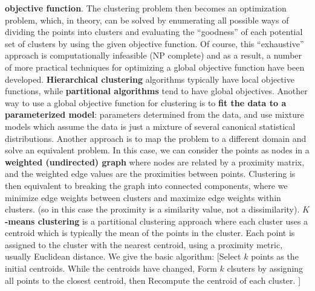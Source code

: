 \documentclass{amsbook}
\makeatletter
\theoremstyle{plain}
\theoremstyle{definition}
\theoremstyle{remark}
\newenvironment{restoretext}%
    {\@parboxrestore%
     \begin{adjustwidth}{}{\leftmargin}%
    }{\end{adjustwidth}
     }
\makeatother
\begin{document}
\textbf{objective  function}.  The  clustering  problem  then  becomes  an  optimization  problem,  
which,  in  theory,  can  be  solved  by  enumerating  all  possible  ways  of  dividing  the  points  
into clusters and evaluating the ``goodness” of each potential set of clusters by using the 
given  objective  function.    Of  course,  this ``exhaustive”  approach  is  computationally  
infeasible  (NP  complete)  and  as  a  result,  a  number  of  more  practical  techniques  for  
optimizing a global objective function have been developed. \textbf{Hierarchical clustering} algorithms typically have local objective functions, while \textbf{partitional algorithms} tend to have global objectives. Another way to use a global objective function for clustering is to \textbf{fit the data to a parameterized model}: parameters determined from the data, and use mixture models which assume the data is just a mixture of several canonical statistical distributions. Another approach is to map the problem to a different domain and solve an equivalent problem. In this case, we can consider the points as nodes in a \textbf{weighted (undirected) graph} where nodes are related by a proximity matrix, and the weighted edge values are the proximities between points. Clustering is then equivalent to breaking the graph into connected components, where we minimize edge weights between clusters and maximize edge weights within clusters. (so in this case the proximity is a similarity value, not a dissimilarity). \textbf{$K$-means clustering} is a partitional clustering approach where each cluster uses a centroid which is typically the mean of the points in the cluster. Each point is assigned to the cluster with the nearest centroid, using a proximity metric, usually Euclidean distance. We give the basic algorithm: [Select $k$ points as the initial centroids. 
While the centroids have changed, Form $k$ clsuters by assigning all points to the closest centroid, then
	Recompute the centroid of each cluster. ]
\begin{comment}
\begin{restoretext}
\begin{algorithm}[H]\label{alg1}
Select $k$ points as the initial centroids. \\
\While{the centroids have changed}{
	Form $k$ clsuters by assigning all points to the closest centroid. \\
	Recompute the centroid of each cluster. 
}
\caption{Cluster$(k)$}
\end{algorithm}
\end{restoretext}
\end{comment}
\end{document}

